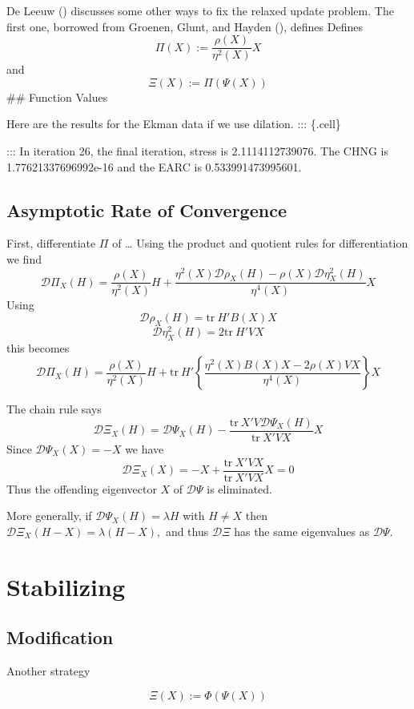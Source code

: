 \documentclass[
  12pt,
  letterpaper,
  DIV=11,
  numbers=noendperiod]{scrartcl}
\begin{document}
De Leeuw () discusses some other ways
to fix the relaxed update problem. The first one, borrowed from Groenen,
Glunt, and Hayden (),
defines Defines \[
\Pi(X):=\frac{\rho(X)}{\eta^2(X)}X
\] and \[
\Xi(X):=\Pi(\Psi(X))
\] \#\# Function Values

Here are the results for the Ekman data if we use dilation. :::
\{.cell\}

::: In iteration 26, the final iteration, stress is 2.1114112739076. The
CHNG is 1.77621337696992e-16 and the EARC is 0.533991473995601.

\subsection{Asymptotic Rate of
Convergence}\label{asymptotic-rate-of-convergence-6}

First, differentiate \(\Pi\) of \ldots{} Using the product and quotient
rules for differentiation we find \[
\mathcal{D}\Pi_X(H)=\frac{\rho(X)}{\eta^2(X)}H+\frac{\eta^2(X)\mathcal{D}\rho_X(H)-\rho(X)\mathcal{D}\eta^2_X(H)}{\eta^4(X)}X
\] Using \[
\mathcal{D}\rho_X(H)=\text{tr}\ H'B(X)X
\] \[
\mathcal{D}\eta^2_X(H)=2\text{tr}\ H'VX
\] this becomes \[
\mathcal{D}\Pi_X(H)=\frac{\rho(X)}{\eta^2(X)}H+\text{tr}\ H'\left\{\frac{\eta^2(X) B(X)X-2\rho(X)VX}{\eta^4(X)}\right\}X
\]

The chain rule says \[
\mathcal{D}\Xi_X(H)=\mathcal{D}\Psi_X(H)-\frac{\text{tr}\ X'V\mathcal{D}\Psi_X(H)}{\text{tr}\ X'VX}X
\] Since \(\mathcal{D}\Psi_X(X)=-X\) we have \[
\mathcal{D}\Xi_X(X)=-X+\frac{\text{tr}\ X'VX}{\text{tr}\ X'VX}X=0
\] Thus the offending eigenvector \(X\) of \(\mathcal{D}\Psi\) is
eliminated.

More generally, if \(\mathcal{D}\Psi_X(H)=\lambda H\) with \(H\not= X\)
then \(\mathcal{D}\Xi_X(H-X)=\lambda (H-X),\) and thus
\(\mathcal{D}\Xi\) has the same eigenvalues as \(\mathcal{D}\Psi\).

\section{Stabilizing}\label{stabilizing}

\subsection{Modification}\label{modification-6}

Another strategy

\begin{equation}
\Xi(X):=\Phi(\Psi(X))
\end{equation}
\end{document}
